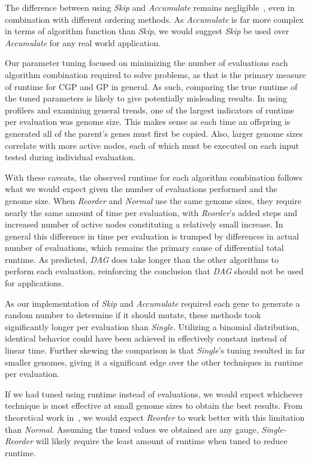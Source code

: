 \documentclass[journal]{IEEEtran}
\begin{document}
The difference between using \emph{Skip} and \emph{Accumulate} remains
negligible~\cite{goldman:2013:cgpwaste}, even in combination with different ordering
methods.  As \emph{Accumulate} is far more complex in terms of algorithm function
than \emph{Skip}, we would suggest \emph{Skip} be used over \emph{Accumulate} for
any real world application.

Our parameter tuning focused on minimizing the number of evaluations each algorithm
combination required to solve problems, as that is the primary measure of runtime
for CGP and GP in general.  As such, comparing the true runtime of the tuned parameters
is likely to give potentially misleading results.  In using profilers and examining
general trends, one of the largest indicators of runtime per evaluation was genome size.
This makes sense as each time an offspring is generated all of the parent's genes
must first be copied.  Also, larger genome sizes correlate with more active nodes,
each of which must be executed on each input tested during individual evaluation.

With these caveats, the observed runtime for each algorithm combination follows
what we would expect given the number of evaluations performed and the genome size.
When \emph{Reorder} and \emph{Normal} use the same genome sizes, they require
nearly the same amount of time per evaluation, with \emph{Reorder}'s added
steps and increased number of active nodes constituting a relatively small increase.
In general this difference in time per evaluation is trumped by differences in
actual number of evaluations, which remains the primary cause of differential total runtime.
As predicted, \emph{DAG} does take longer than the other algorithms to perform each evaluation,
reinforcing the conclusion that \emph{DAG} should not be used for applications.

As our implementation of \emph{Skip} and \emph{Accumulate} required each gene
to generate a random number to determine if it should mutate, these methods took
significantly longer per evaluation than \emph{Single}.  Utilizing a binomial
distribution, identical behavior could have been achieved in effectively constant
instead of linear time.  Further skewing the comparison is that \emph{Single}'s
tuning resulted in far smaller genomes, giving it a significant edge over the other
techniques in runtime per evaluation.

If we had tuned using runtime instead of evaluations, we would expect whichever
technique is most effective at small genome sizes to obtain the best results.
From theoretical work in~\cite{goldman:2013:ordering}, we would expect \emph{Reorder}
to work better with this limitation than \emph{Normal}.  Assuming the tuned values
we obtained are any gauge, \emph{Single-Reorder} will likely require the least
amount of runtime when tuned to reduce runtime.
\end{document}
